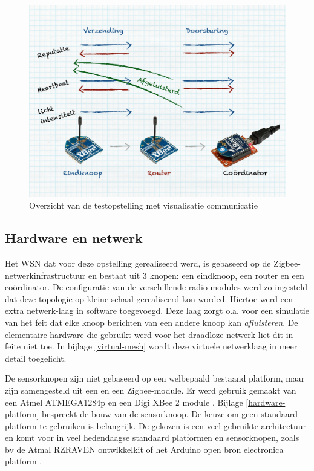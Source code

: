 \begin{figure}[ht]
  \centering
  \includegraphics[width=0.75\linewidth]{resources/setup.pdf}
  \caption{Overzicht van de testopstelling met visualisatie communicatie}
  \label{fig:setup}
\end{figure}

\vspace{-5mm}

\subsection{Hardware en netwerk}
\label{subsection:eval-hardware}

Het WSN dat voor deze opstelling gerealiseerd werd, is gebaseerd op de
Zigbee-netwerkinfrastructuur en bestaat uit 3 knopen: een eindknoop, een router
en een co\"ordinator. De configuratie van de verschillende radio-modules werd
zo ingesteld dat deze topologie op kleine schaal gerealiseerd kon worded.
Hiertoe werd een extra netwerk-laag in software toegevoegd. Deze laag zorgt
o.a. voor een simulatie van het feit dat elke knoop berichten van een andere
knoop kan \emph{afluisteren}. De elementaire hardware die gebruikt werd voor
het draadloze netwerk liet dit in feite niet toe. In bijlage \ref{virtual-mesh}
wordt deze virtuele netwerklaag in meer detail toegelicht.

De sensorknopen zijn niet gebaseerd op een welbepaald bestaand platform, maar
zijn samengesteld uit een \mcu en een Zigbee-module. Er werd gebruik gemaakt
van een Atmel ATMEGA1284p \citep{datasheet:atmega1284p} en een Digi XBee 2
module \citep{manual:xbee}. Bijlage \ref{hardware-platform} bespreekt de bouw
van de sensorknoop. De keuze om geen standaard platform te gebruiken is
belangrijk. De gekozen \mcu is een veel gebruikte architectuur en komt voor in
veel hedendaagse standaard platformen en sensorknopen, zoals bv de Atmal
RZRAVEN ontwikkelkit \citep{manual:rzraven} of het Arduino open bron
electronica platform \citep{url:arduino}.

